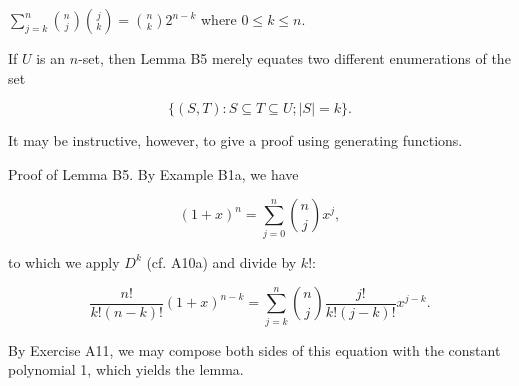 $\sum_{j=k}^{n} \binom{n}{j} \binom{j}{k} = \binom{n}{k} 2^{n-k}$ where $0 \leq k \leq n$.

If $U$ is an $n$-set, then Lemma B5 merely equates two different enumerations of the set

$$\{(S, T): S \subseteq T \subseteq U; |S| = k\}.$$

It may be instructive, however, to give a proof using generating functions.

Proof of Lemma B5. By Example B1a, we have

$$(1+x)^n = \sum_{j=0}^{n} \binom{n}{j} x^j,$$

to which we apply $D^k$ (cf. A10a) and divide by $k!$:

$$\frac{n!}{k!(n-k)!} (1+x)^{n-k} = \sum_{j=k}^{n} \binom{n}{j} \frac{j!}{k!(j-k)!} x^{j-k}.$$

By Exercise A11, we may compose both sides of this equation with the constant polynomial 1, which yields the lemma.
